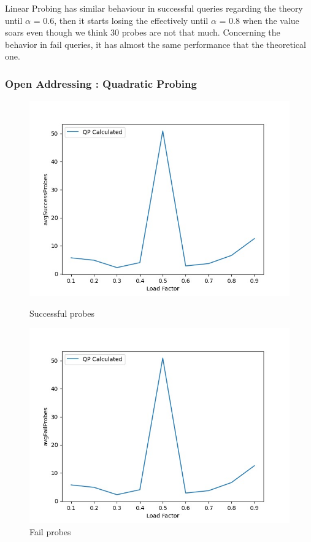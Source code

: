\documentclass{article}
\begin{document}
     Linear Probing has similar behaviour in successful queries regarding the theory until $\alpha$ = 0.6, then it starts losing the effectively until $\alpha$ = 0.8 when the value soars even though we think 30 probes are not that much.
    Concerning the behavior in fail queries, it has almost the same performance that the theoretical one.
    
\subsubsection*{Open Addressing : Quadratic Probing}

        \begin{figure}[H]
          \includegraphics[width=\linewidth]{images/loadFactor_vs_avgSuccessProbes_QP.jpeg}
          \caption{Successful probes}\label{fig:plot6}
        \endminipage\hfill
          \includegraphics[width=\linewidth]{images/loadFactor_vs_avgFailProbes_QP.jpeg}
          \caption{Fail probes}\label{fig:plot7}
        \endminipage
    \end{figure}
    
\end{document}
